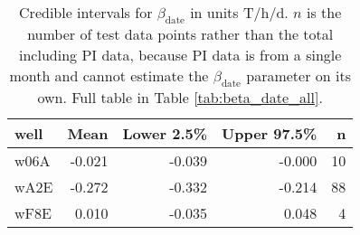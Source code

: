 \begin{table}[h]
\centering
\begin{tabular}{lrrrr}
  \hline
well & Mean & Lower 2.5\% & Upper 97.5\% & n \\ 
  \hline
w06A & -0.021 & -0.039 & -0.000 &   10 \\ 
  wA2E & -0.272 & -0.332 & -0.214 &   88 \\ 
  wF8E & 0.010 & -0.035 & 0.048 &    4 \\ 
   \hline
\end{tabular}
\caption{Credible intervals for $\beta_\text{date}$ in units T/h/d. $n$ is the number of test data points rather than the total including PI data, because PI data is from a single month and cannot estimate the $\beta_\text{date}$ parameter on its own. Full table in Table \ref{tab:beta_date_all}.} 
\label{tab:beta_date}
\end{table}
